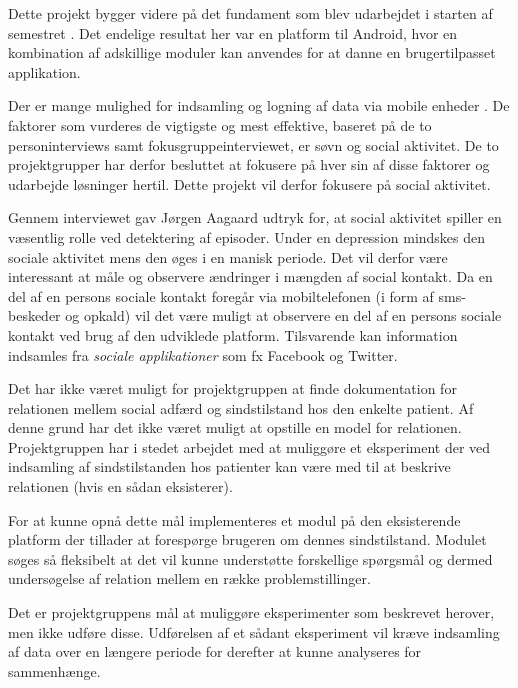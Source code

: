 Dette projekt bygger videre på det fundament som blev udarbejdet i starten af semestret \citefaelles{}.
Det endelige resultat her var en platform til Android, hvor en kombination af adskillige moduler kan anvendes for at danne en brugertilpasset applikation.

Der er mange mulighed  for indsamling og logning af data via mobile enheder .
De faktorer som vurderes de vigtigste og mest effektive, baseret på de to personinterviews samt fokusgruppeinterviewet, er søvn og social aktivitet.
De to projektgrupper har derfor besluttet at fokusere på hver sin af disse faktorer og udarbejde løsninger hertil.
Dette projekt vil derfor fokusere på social aktivitet.

Gennem interviewet gav Jørgen Aagaard udtryk for, at social aktivitet spiller en væsentlig rolle ved detektering af episoder.
Under en depression mindskes den sociale aktivitet mens den øges i en manisk periode.
Det vil derfor være interessant at måle og observere ændringer i mængden af social kontakt.
Da en del af en persons sociale kontakt foregår via mobiltelefonen (i form af sms-beskeder og opkald) vil det være muligt at observere en del af en persons sociale kontakt ved brug af den udviklede platform.
Tilsvarende kan information indsamles fra \textit{sociale applikationer} som fx Facebook og Twitter.

Det har ikke været muligt for projektgruppen at finde dokumentation for relationen mellem social adfærd og sindstilstand hos den enkelte patient.
Af denne grund har det ikke været muligt at opstille en model for relationen.
Projektgruppen har i stedet arbejdet med at muliggøre et eksperiment der ved indsamling af sindstilstanden hos patienter kan være med til at beskrive relationen (hvis en sådan eksisterer).

For at kunne opnå dette mål implementeres et modul på den eksisterende platform \citefaelles{} der tillader at forespørge brugeren om dennes sindstilstand.
Modulet søges så fleksibelt at det vil kunne understøtte forskellige spørgsmål og dermed undersøgelse af relation mellem en række problemstillinger.

Det er projektgruppens mål at muliggøre eksperimenter som beskrevet herover, men ikke udføre disse.
Udførelsen af et sådant eksperiment vil kræve indsamling af data over en længere periode for derefter at kunne analyseres for sammenhænge.